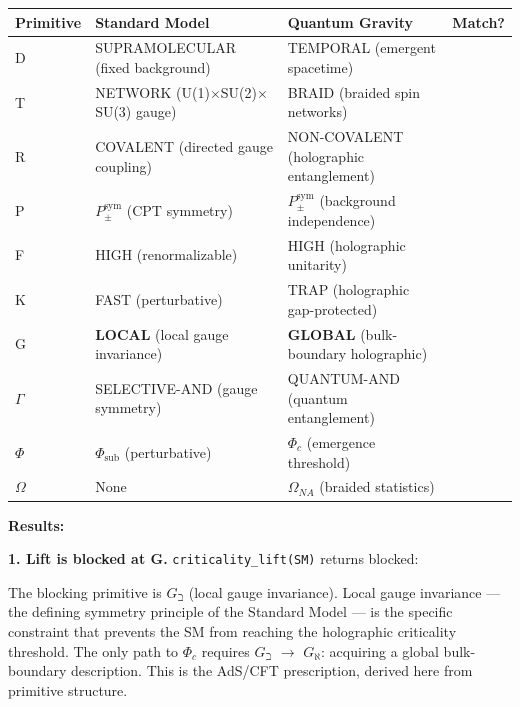 \documentclass[12pt,a4paper]{article}
\begin{document}
\begin{table}[htbp]
\centering
\small
{}
\begin{tabularx}{\textwidth}{>{\centering\arraybackslash}X >{\centering\arraybackslash}X >{\centering\arraybackslash}X >{\centering\arraybackslash}X}
\toprule
\rowcolor{gray!25}\textbf{Primitive} & \textbf{Standard Model} & \textbf{Quantum Gravity} & \textbf{Match?} \\
\midrule
\rowcolors{1}{white}{gray!10}
D & SUPRAMOLECULAR (fixed background) & TEMPORAL (emergent spacetime) &  \\
T & NETWORK (U(1)$\times$SU(2)$\times$SU(3) gauge) & BRAID (braided spin networks) &  \\
R & COVALENT (directed gauge coupling) & NON-COVALENT (holographic entanglement) &  \\
P & $P_{\pm}^\text{sym}$ (CPT symmetry) & $P_{\pm}^\text{sym}$ (background independence) &  \\
F & HIGH (renormalizable) & HIGH (holographic unitarity) &  \\
K & FAST (perturbative) & TRAP (holographic gap-protected) &  \\
G & \textbf{LOCAL} (local gauge invariance) & \textbf{GLOBAL} (bulk-boundary holographic) &  \\
$\Gamma$ & SELECTIVE-AND (gauge symmetry) & QUANTUM-AND (quantum entanglement) &  \\
$\Phi$ & $\Phi_\text{sub}$ (perturbative) & $\Phi_c$ (emergence threshold) &  \\
$\Omega$ & None & $\Omega_{NA}$ (braided statistics) &  \\
\bottomrule
\end{tabularx}
\end{table}

\textbf{Results:}

\textbf{1. Lift is blocked at G.} \texttt{criticality\_lift(SM)} returns blocked:

\begin{quote}
\end{quote}

The blocking primitive is $G_{\beth}$ (local gauge invariance). Local gauge invariance --- the defining symmetry principle of the Standard Model --- is the specific constraint that prevents the SM from reaching the holographic criticality threshold. The only path to $\Phi_c$ requires $G_{\beth}$ $\to$ $G_{\aleph}$: acquiring a global bulk-boundary description. This is the AdS/CFT prescription, derived here from primitive structure.
\end{document}
